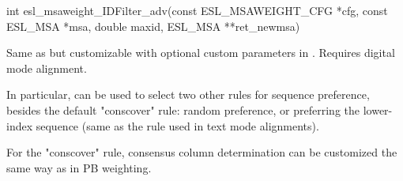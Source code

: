 \begin{sreapi}
\hypertarget{func:esl_msaweight_IDFilter_adv()}
{\item[int esl\_msaweight\_IDFilter\_adv(const ESL\_MSAWEIGHT\_CFG *cfg, const ESL\_MSA *msa, double maxid, ESL\_MSA **ret\_newmsa)]}

Same as  but customizable with
optional custom parameters in . Requires digital
mode alignment.

In particular,  can be used to select two other
rules for sequence preference, besides the default
"conscover" rule: random preference, or preferring the
lower-index sequence (same as the rule used in text mode
alignments).

For the "conscover" rule, consensus column determination
can be customized the same way as in PB weighting.


\end{sreapi}

